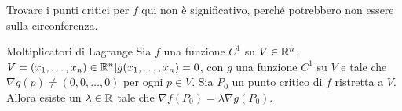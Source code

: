 \begin{osservazione}{}
  Trovare i punti critici per $f$ qui non è significativo, perché potrebbero non essere sulla circonferenza.
\end{osservazione}

\begin{teorema}{Moltiplicatori di Lagrange}
  Sia $f$ una funzione $C^1$ su $V\in \mathbb{R}^n$, $V={(x_1, \dots, x_n)\in \mathbb{R}^n | g(x_1, \dots, x_n) = 0}$, con $g$ una funzione $C^1$ su $V$ e tale che $\nabla g(p) \neq (0, 0, \dots, 0)$ per ogni $p \in V$. Sia $P_0$ un punto critico di $f$ ristretta a $V$. Allora esiste un $\lambda \in \mathbb{R}$ tale che $\nabla f(P_0) = \lambda \nabla g(P_0)$.
\end{teorema}



